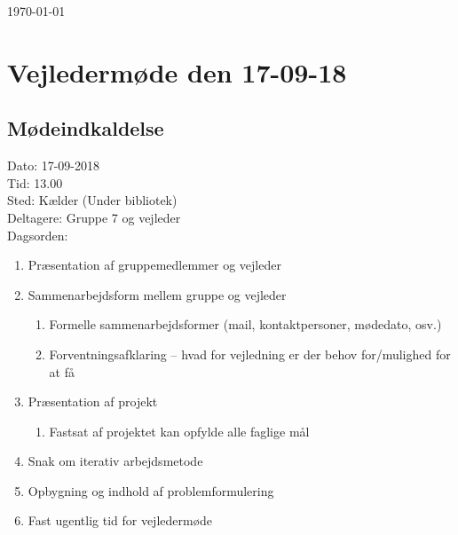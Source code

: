 \documentclass[12pt]{article}
\begin{document}
\begin{titlepage}

{\large \today}\\[2cm] %




\vfill %

\end{titlepage}

\section{Vejledermøde den 17-09-18}
\subsection{Mødeindkaldelse}
Dato: 17-09-2018
\\Tid: 13.00
\\Sted: Kælder (Under bibliotek)
\\Deltagere: Gruppe 7 og vejleder
\\Dagsorden:
\begin{enumerate}
    \item Præsentation af gruppemedlemmer og vejleder
    \item Sammenarbejdsform mellem gruppe og vejleder
    \begin{enumerate}
        \item Formelle sammenarbejdsformer (mail, kontaktpersoner, mødedato, osv.)
        \item Forventningsafklaring – hvad for vejledning er der behov for/mulighed for at få
    \end{enumerate}
    \item Præsentation af projekt
    \begin{enumerate}
        \item Fastsat af projektet kan opfylde alle faglige mål 
    \end{enumerate}
    \item Snak om iterativ arbejdsmetode
    \item Opbygning og indhold af problemformulering
    \item Fast ugentlig tid for vejledermøde
\end{enumerate}
 
\end{document}
